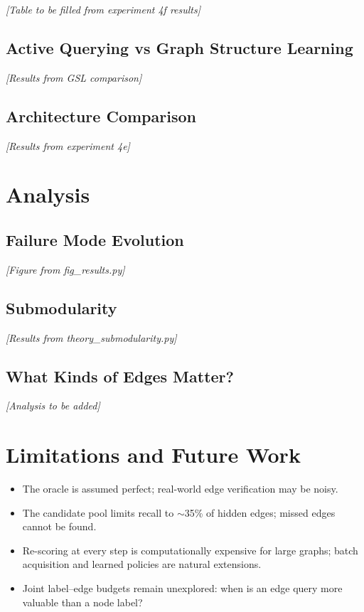 \documentclass{article}
\begin{document}
\emph{[Table to be filled from experiment 4f results]}

\subsection{Active Querying vs Graph Structure Learning}
\label{sec:exp_gsl}

\emph{[Results from GSL comparison]}

\subsection{Architecture Comparison}

\emph{[Results from experiment 4e]}


\section{Analysis}
\label{sec:analysis}

\subsection{Failure Mode Evolution}
\emph{[Figure from fig\_results.py]}

\subsection{Submodularity}
\emph{[Results from theory\_submodularity.py]}

\subsection{What Kinds of Edges Matter?}
\emph{[Analysis to be added]}


\section{Limitations and Future Work}
\label{sec:limitations}

\begin{itemize}
    \item The oracle is assumed perfect; real-world edge verification may be noisy.
    \item The candidate pool limits recall to $\sim$35\% of hidden edges; missed edges cannot be found.
    \item Re-scoring at every step is computationally expensive for large graphs; batch acquisition and learned policies are natural extensions.
    \item Joint label--edge budgets remain unexplored: when is an edge query more valuable than a node label?
\end{itemize}
\end{document}
